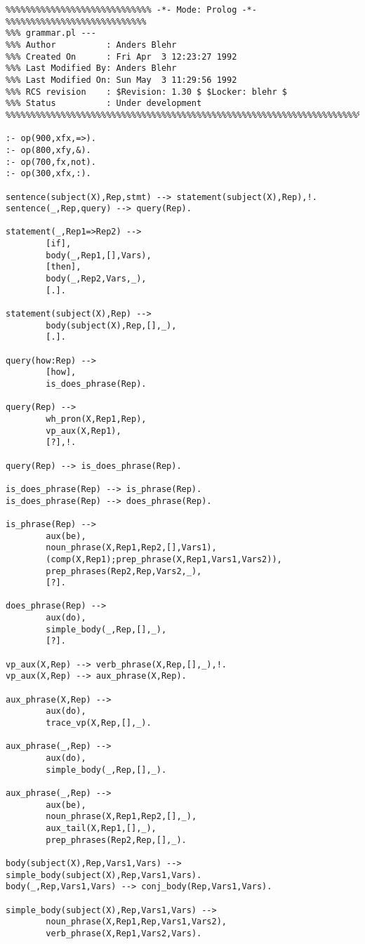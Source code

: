\begin{verbatim}
%%%%%%%%%%%%%%%%%%%%%%%%%%%%% -*- Mode: Prolog -*- %%%%%%%%%%%%%%%%%%%%%%%%%%%%
%%% grammar.pl --- 
%%% Author          : Anders Blehr
%%% Created On      : Fri Apr  3 12:23:27 1992
%%% Last Modified By: Anders Blehr
%%% Last Modified On: Sun May  3 11:29:56 1992
%%% RCS revision    : $Revision: 1.30 $ $Locker: blehr $
%%% Status          : Under development
%%%%%%%%%%%%%%%%%%%%%%%%%%%%%%%%%%%%%%%%%%%%%%%%%%%%%%%%%%%%%%%%%%%%%%%%%%%%%%

:- op(900,xfx,=>).
:- op(800,xfy,&).
:- op(700,fx,not).
:- op(300,xfx,:).

sentence(subject(X),Rep,stmt) --> statement(subject(X),Rep),!.
sentence(_,Rep,query) --> query(Rep).

statement(_,Rep1=>Rep2) -->
        [if],
        body(_,Rep1,[],Vars),
        [then],
        body(_,Rep2,Vars,_),
        [.].

statement(subject(X),Rep) --> 
        body(subject(X),Rep,[],_),
        [.].

query(how:Rep) -->
        [how],
        is_does_phrase(Rep).

query(Rep) -->
        wh_pron(X,Rep1,Rep),
        vp_aux(X,Rep1),
        [?],!.

query(Rep) --> is_does_phrase(Rep).

is_does_phrase(Rep) --> is_phrase(Rep).
is_does_phrase(Rep) --> does_phrase(Rep).

is_phrase(Rep) --> 
        aux(be),
        noun_phrase(X,Rep1,Rep2,[],Vars1),
        (comp(X,Rep1);prep_phrase(X,Rep1,Vars1,Vars2)),
        prep_phrases(Rep2,Rep,Vars2,_),
        [?].

does_phrase(Rep) --> 
        aux(do),
        simple_body(_,Rep,[],_),
        [?].

vp_aux(X,Rep) --> verb_phrase(X,Rep,[],_),!.
vp_aux(X,Rep) --> aux_phrase(X,Rep).

aux_phrase(X,Rep) -->
        aux(do),
        trace_vp(X,Rep,[],_).

aux_phrase(_,Rep) -->
        aux(do),
        simple_body(_,Rep,[],_).

aux_phrase(_,Rep) -->
        aux(be),
        noun_phrase(X,Rep1,Rep2,[],_),
        aux_tail(X,Rep1,[],_),
        prep_phrases(Rep2,Rep,[],_).

body(subject(X),Rep,Vars1,Vars) --> simple_body(subject(X),Rep,Vars1,Vars).
body(_,Rep,Vars1,Vars) --> conj_body(Rep,Vars1,Vars).

simple_body(subject(X),Rep,Vars1,Vars) -->
        noun_phrase(X,Rep1,Rep,Vars1,Vars2),
        verb_phrase(X,Rep1,Vars2,Vars).


\end{verbatim}
